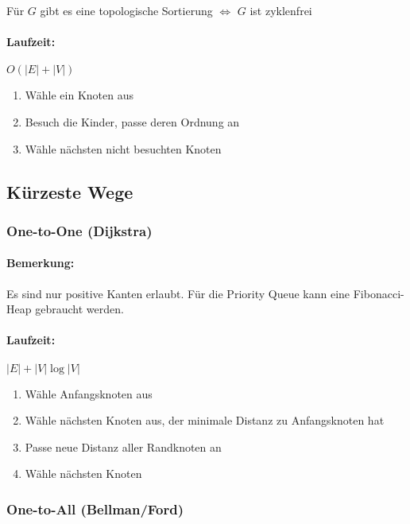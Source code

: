 \documentclass[11pt]{article}
\begin{document}
\begin{center}
	Für $G$ gibt es eine topologische Sortierung $\Leftrightarrow$ $G$ ist zyklenfrei
\end{center}

\paragraph{Laufzeit:} $O(|E|+|V|)$

\begin{enumerate}[noitemsep]
	\item Wähle ein Knoten aus
	\item Besuch die Kinder, passe deren Ordnung an
	\item Wähle nächsten nicht besuchten Knoten
\end{enumerate}

\subsection{Kürzeste Wege}

\subsubsection{One-to-One (Dijkstra)}

\paragraph{Bemerkung:} Es sind nur positive Kanten erlaubt. Für die Priority Queue kann eine Fibonacci-Heap gebraucht werden.

\paragraph{Laufzeit:} $|E| + |V| \log|V|$

\begin{enumerate}[noitemsep]
	\item Wähle Anfangsknoten aus
	\item Wähle nächsten Knoten aus, der minimale Distanz zu Anfangsknoten hat
	\item Passe neue Distanz aller Randknoten an
	\item Wähle nächsten Knoten
\end{enumerate}

\subsubsection{One-to-All (Bellman/Ford)}
\end{document}
